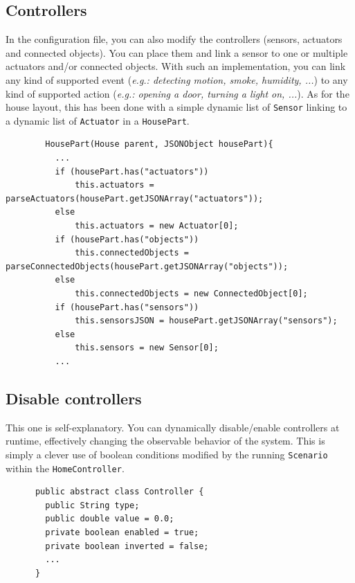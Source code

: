     \subsection{Controllers}
      In the configuration file, you can also modify the controllers (sensors, actuators and connected objects). You can place them and link a sensor to one or multiple actuators and/or connected objects. With such an implementation, you can link any kind of supported event (\emph{e.g.: detecting motion, smoke, humidity, ...}) to any kind of supported action (\emph{e.g.: opening a door, turning a light on, ...}). As for the house layout, this has been done with a simple dynamic list of \texttt{Sensor} linking to a dynamic list of \texttt{Actuator} in a \texttt{HousePart}.
      \begin{verbatim}
        HousePart(House parent, JSONObject housePart){
          ...
          if (housePart.has("actuators"))
              this.actuators = parseActuators(housePart.getJSONArray("actuators"));
          else
              this.actuators = new Actuator[0];
          if (housePart.has("objects"))
              this.connectedObjects = parseConnectedObjects(housePart.getJSONArray("objects"));
          else
              this.connectedObjects = new ConnectedObject[0];
          if (housePart.has("sensors"))
              this.sensorsJSON = housePart.getJSONArray("sensors");
          else
              this.sensors = new Sensor[0];
          ...
      \end{verbatim}

    \subsection{Disable controllers}
      This one is self-explanatory. You can dynamically disable/enable controllers at runtime, effectively changing the observable behavior of the system. This is simply a clever use of boolean conditions modified by the running \texttt{Scenario} within the \texttt{HomeController}.
      \begin{verbatim}
      public abstract class Controller {
        public String type;
        public double value = 0.0;
        private boolean enabled = true;
        private boolean inverted = false;
        ...
      }
      \end{verbatim}

